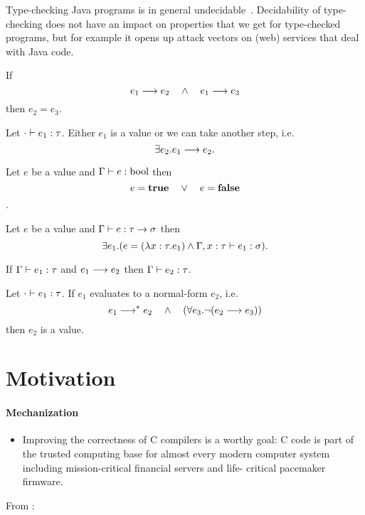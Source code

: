 {Type-checking Java programs is in general undecidable~\cite{grigore2017}.
Decidability of type-checking does not have an impact on properties that we get
for type-checked programs, but for example it opens up attack vectors on (web)
services that deal with Java code.






\begin{thm}[Determinacy]
  If  \[ {e_1} \longrightarrow {e_2} \quad \wedge \quad {e_1} \longrightarrow {e_3} \] then $e_2 = e_3$.
\end{thm}

\begin{lem}[Progress]
  Let ${\cdot} \vdash {e_1} : {\tau}$. Either $e_1$ is a value or we can take another
  step, i.e.
  \[ \exists e_2. {e_1} \longrightarrow {e_2}. \]
\end{lem}

\begin{lem}
  Let $e$ be a value and ${\Gamma} \vdash {e} : {\text{bool}}$ then
  \[ e = \textbf{true} \quad \vee \quad e = \textbf{false} \].
\end{lem}

\begin{lem}
  Let $e$ be a value and ${\Gamma} \vdash {e} : {\tau \to \sigma}$ then
  \[ \exists e_1. (e = (\lambda x:\tau.e_1) \wedge {\Gamma, x:\tau} \vdash {e_1} : {\sigma}). \]
\end{lem}

\begin{lem}[Preservation]
  If ${\Gamma} \vdash {e_1} : {\tau}$ and ${e_1} \longrightarrow {e_2}$ then ${\Gamma} \vdash {e_2} : {\tau}$.
\end{lem}

\begin{thm}
  Let ${\cdot} \vdash {e_1} : {\tau}$. If $e_1$ evaluates to a normal-form $e_2$,
  i.e.
  \[ {e_1} \longrightarrow^* {e_2} \quad \wedge \quad (\forall e_3. \neg ({e_2} \longrightarrow {e_3})) \]
  then $e_2$ is a value.
\end{thm}



\section{Motivation}




\paragraph{Mechanization}
\begin{itemize}
\item
  Improving the correctness of C compilers is a worthy goal: C code is part of
  the trusted computing base for almost every modern computer system including
  mission-critical financial servers and life- critical pacemaker firmware.
\end{itemize}
From \cite{yang2011bugs}:

}
